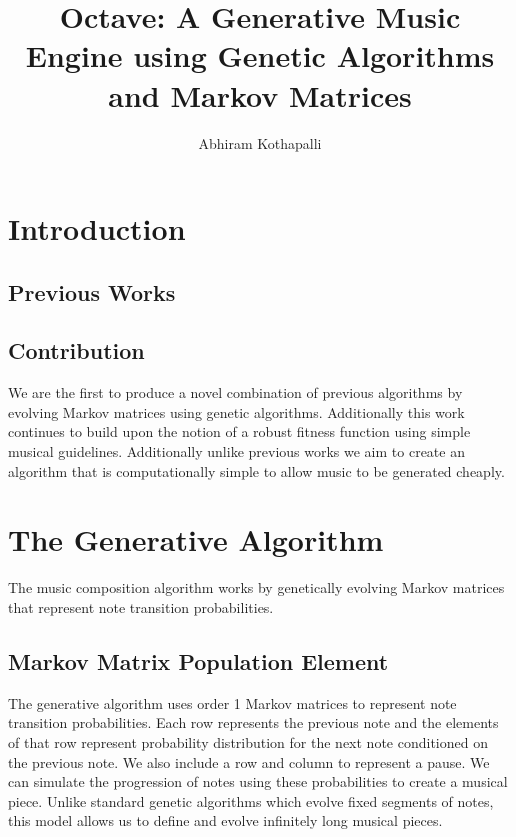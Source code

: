 \documentclass{article}
\title{Octave: A Generative Music Engine using Genetic Algorithms and Markov Matrices}
\author{Abhiram Kothapalli}
\date{}
\begin{document}
\maketitle

\begin{abstract}

\end{abstract}

\section{Introduction}

\subsection{Previous Works}

\subsection{Contribution}

We are the first to produce a novel combination of previous algorithms by evolving Markov matrices using genetic algorithms. Additionally this work continues to build upon the notion of a robust fitness function using simple musical guidelines. Additionally unlike previous works we aim to create an algorithm that is computationally simple to allow music to be generated cheaply.

\section{The Generative Algorithm}

The music composition algorithm works by genetically evolving Markov matrices that represent note transition probabilities.

\subsection{Markov Matrix Population Element}

The generative algorithm uses order 1 Markov matrices to represent note transition probabilities. Each row represents the previous note and the elements of that row represent probability distribution for the next note conditioned on the previous note. We also include a row and column to represent a pause. We can simulate the progression of notes using these probabilities to create a musical piece. Unlike standard genetic algorithms which evolve fixed segments of notes, this model allows us to define and evolve infinitely long musical pieces.
\end{document}
